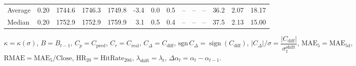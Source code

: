 \begin{threeparttable}
{\begin{tabular}{lrrrrrrrrrrrrr}
Average &     0.20 & 1744.6 & 1746.3 & 1749.8 &       -3.4 &                      0.0 &                 0.5 &         -- &        -- &             -- &             36.2 &            2.07 &                  18.17 \\
 Median &     0.20 & 1752.9 & 1752.9 & 1759.9 &        3.1 &                      0.5 &                 0.4 &         -- &        -- &             -- &             37.5 &            2.13 &                  15.00 \\
\bottomrule
\end{tabular}
}
\begin{tablenotes}\footnotesize
\item $\kappa=\kappa(\sigma)$, $B=B_{t-1}$, $C_p=C_{\text{pred}}$, $C_r=C_{\text{real}}$, $C_\Delta=C_{\text{diff}}$, $\mathrm{sgn}\,C_\Delta=\operatorname{sign}(C_{\text{diff}})$, $|C_\Delta|/\sigma=\dfrac{|C_{\text{diff}}|}{\sigma_t^{\text{shift}}}$, $\mathrm{MAE}_5=\mathrm{MAE}_{5\text{d}}$, $\mathrm{RMAE}= \mathrm{MAE}_5 / \text{Close}$, $\mathrm{HR}_{20}=\mathrm{HitRate}_{20\text{d}}$, 
$\lambda_{\text{shift}}=\lambda_t$, 
$\Delta\alpha_t=\alpha_t-\alpha_{t-1}$.
\end{tablenotes}
\end{threeparttable}
\endgroup

